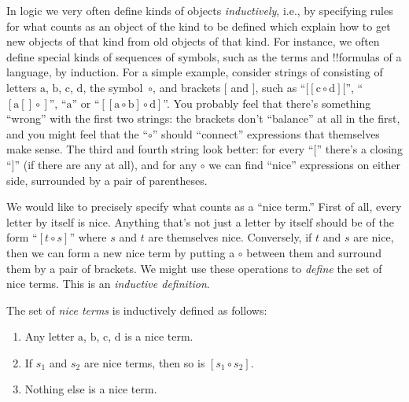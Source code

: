 \documentclass[../../../include/open-logic-section]{subfiles}
\begin{document}

In logic we very often define kinds of objects \emph{inductively},
i.e., by specifying rules for what counts as an object of the kind to
be defined which explain how to get new objects of that kind from old
objects of that kind.  For instance, we often define special kinds of
sequences of symbols, such as the terms and !!{formula}s of a
language, by induction.  For a simple example, consider strings of
consisting of letters $\mathrm{a}$, $\mathrm{b}$, $\mathrm{c}$,
$\mathrm{d}$, the symbol~$\circ$, and brackets $[$ and $]$, such as
``$[[\mathrm{c} \circ \mathrm{d}][$'', ``$[\mathrm{a}[]\circ]$'',
``$\mathrm{a}$'' or ``$[[\mathrm{a} \circ \mathrm{b}]\circ
\mathrm{d}]$''.  You probably feel that there's something
``wrong'' with the first two strings: the brackets don't
``balance'' at all in the first, and you might feel that the
``$\circ$'' should ``connect'' expressions that themselves make
sense. The third and fourth string look better: for every ``$[$''
there's a closing ``$]$'' (if there are any at all), and for any
$\circ$ we can find ``nice'' expressions on either side,
surrounded by a pair of parentheses.

We would like to precisely specify what counts as a ``nice term.''
First of all, every letter by itself is nice.  Anything that's not
just a letter by itself should be of the form ``$[t \circ s]$'' where
$s$ and $t$ are themselves nice. Conversely, if $t$ and $s$ are nice,
then we can form a new nice term by putting a $\circ$ between them and
surround them by a pair of brackets.  We might use these operations
to \emph{define} the set of nice terms.  This is an \emph{inductive
  definition}.

\begin{defn}
  The set of \emph{nice terms} is inductively defined as follows:
  \begin{enumerate}
  \item Any letter $\mathrm{a}$, $\mathrm{b}$, $\mathrm{c}$,
    $\mathrm{d}$ is a nice term.
  \item If $s_1$ and $s_2$ are nice terms, then so
    is $[s_1 \circ s_2]$.
  \item Nothing else is a nice term.
  \end{enumerate}
\end{defn}
\end{document}
